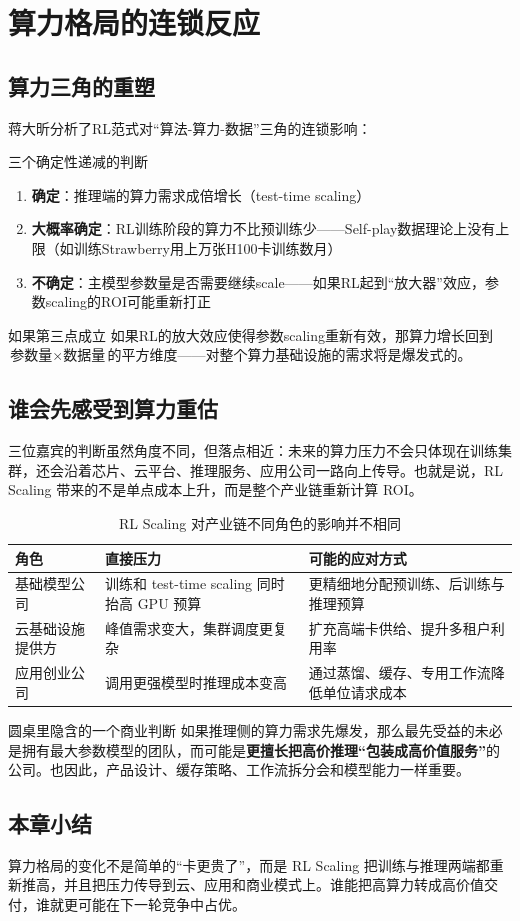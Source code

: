 \section{算力格局的连锁反应}

\subsection{算力三角的重塑}

蒋大昕分析了RL范式对``算法-算力-数据''三角的连锁影响：

\begin{importantbox}{三个确定性递减的判断}
\begin{enumerate}
\item \textbf{确定}：推理端的算力需求成倍增长（test-time scaling）
\item \textbf{大概率确定}：RL训练阶段的算力不比预训练少——Self-play数据理论上没有上限（如训练Strawberry用上万张H100卡训练数月）
\item \textbf{不确定}：主模型参数量是否需要继续scale——如果RL起到``放大器''效应，参数scaling的ROI可能重新打正
\end{enumerate}
\end{importantbox}

\begin{warningbox}{如果第三点成立}
如果RL的放大效应使得参数scaling重新有效，那算力增长回到$\text{参数量} \times \text{数据量}$的平方维度——对整个算力基础设施的需求将是爆发式的。
\end{warningbox}

\subsection{谁会先感受到算力重估}
三位嘉宾的判断虽然角度不同，但落点相近：未来的算力压力不会只体现在训练集群，还会沿着芯片、云平台、推理服务、应用公司一路向上传导。也就是说，RL Scaling 带来的不是单点成本上升，而是整个产业链重新计算 ROI。

\begin{table}[H]
\centering
\begin{tabular}{p{3.2cm}p{5.2cm}p{5cm}}
\toprule
角色 & 直接压力 & 可能的应对方式 \\
\midrule
基础模型公司 & 训练和 test-time scaling 同时抬高 GPU 预算 & 更精细地分配预训练、后训练与推理预算 \\
云基础设施提供方 & 峰值需求变大，集群调度更复杂 & 扩充高端卡供给、提升多租户利用率 \\
应用创业公司 & 调用更强模型时推理成本变高 & 通过蒸馏、缓存、专用工作流降低单位请求成本 \\
\bottomrule
\end{tabular}
\caption{RL Scaling 对产业链不同角色的影响并不相同}
\end{table}

\begin{knowledgebox}{圆桌里隐含的一个商业判断}
如果推理侧的算力需求先爆发，那么最先受益的未必是拥有最大参数模型的团队，而可能是\textbf{更擅长把高价推理“包装成高价值服务”}的公司。也因此，产品设计、缓存策略、工作流拆分会和模型能力一样重要。
\end{knowledgebox}

\subsection{本章小结}
算力格局的变化不是简单的“卡更贵了”，而是 RL Scaling 把训练与推理两端都重新推高，并且把压力传导到云、应用和商业模式上。谁能把高算力转成高价值交付，谁就更可能在下一轮竞争中占优。


